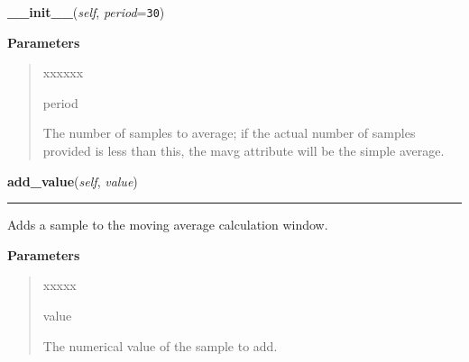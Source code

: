 \hspace{.8\funcindent}\begin{boxedminipage}{\funcwidth}

    \raggedright \textbf{\_\_init\_\_}(\textit{self}, \textit{period}={\tt 30})

\setlength{\parskip}{2ex}
\setlength{\parskip}{1ex}
      \textbf{Parameters}
      \vspace{-1ex}

      \begin{quote}
        \begin{Ventry}{xxxxxx}

          \item[period]

          The number of samples to average; if the actual number of samples
          provided is less than this, the mavg attribute will be the simple
          average.

        \end{Ventry}

      \end{quote}

    \end{boxedminipage}

    \label{nukaquant:MovingAverage:add_value}

    \vspace{0.5ex}

\hspace{.8\funcindent}\begin{boxedminipage}{\funcwidth}

    \raggedright \textbf{add\_value}(\textit{self}, \textit{value})

    \vspace{-1.5ex}

    \rule{\textwidth}{0.5\fboxrule}
\setlength{\parskip}{2ex}
    Adds a sample to the moving average calculation window.

\setlength{\parskip}{1ex}
      \textbf{Parameters}
      \vspace{-1ex}

      \begin{quote}
        \begin{Ventry}{xxxxx}

          \item[value]

          The numerical value of the sample to add.

        \end{Ventry}

      \end{quote}

    \end{boxedminipage}


